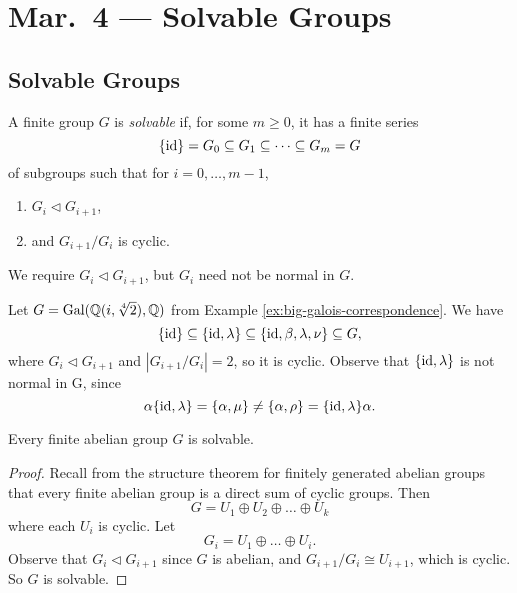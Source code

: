 \chapter{Mar.~4 --- Solvable Groups}

\section{Solvable Groups}
\begin{definition}
  A finite group $G$ is \emph{solvable} if, for some
  $m \ge 0$, it has a finite series
  \[
    \{\mathrm{id}\} = G_0 \subseteq G_1 \subseteq \dots \subseteq G_m = G
  \]
  of subgroups such that for $i = 0, \dots, m - 1$,
  \begin{enumerate}
    \item $G_i \triangleleft G_{i + 1}$,
    \item and $G_{i + 1} / G_i$ is cyclic.
  \end{enumerate}
\end{definition}

\begin{remark}
  We require $G_i \triangleleft G_{i + 1}$, but
  $G_i$ need not be normal in $G$.
\end{remark}

\begin{example}
  Let $G = \operatorname{Gal}(\mathbb{Q}(i, \sqrt[4]{2}), \mathbb{Q})$ from Example
  \ref{ex:big-galois-correspondence}. We have
  \[
    \{\mathrm{id}\} \subseteq \{\mathrm{id}, \lambda\} \subseteq \{\mathrm{id}, \beta, \lambda, \nu\} \subseteq G,
  \]
  where $G_i \triangleleft G_{i + 1}$ and
  $|G_{i + 1} / G_i| = 2$, so it is cyclic. Observe
  that $\{\mathrm{id}, \lambda\}$ is not normal in G, since
  \[
    \alpha \{\mathrm{id}, \lambda\} = \{\alpha, \mu\}
    \ne \{\alpha, \rho\} = \{\mathrm{id}, \lambda\} \alpha.
  \]
\end{example}

\begin{theorem}
  Every finite abelian group $G$ is solvable.
\end{theorem}

\begin{proof}
  Recall from the structure theorem for finitely generated
  abelian groups that every finite abelian group is
  a direct sum of cyclic groups. Then
  \[
    G = U_1 \oplus U_2 \oplus \dots \oplus U_k
  \]
  where each $U_i$ is cyclic. Let
  \[
    G_i = U_1 \oplus \dots \oplus U_i.
  \]
  Observe that $G_i \triangleleft G_{i + 1}$ since
  $G$ is abelian, and $G_{i + 1} / G_i \cong U_{i + 1}$,
  which is cyclic. So $G$ is solvable.
\end{proof}

